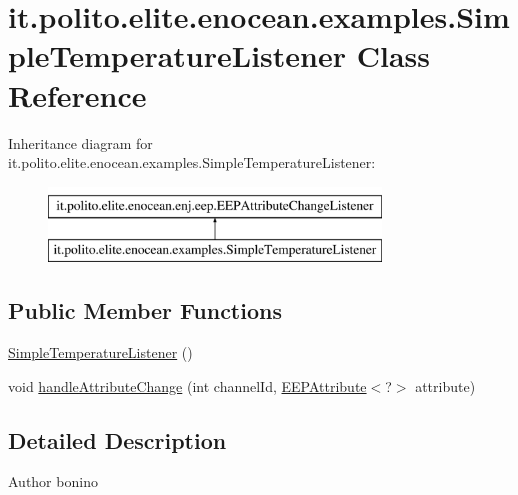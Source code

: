 \hypertarget{classit_1_1polito_1_1elite_1_1enocean_1_1examples_1_1_simple_temperature_listener}{}\section{it.\+polito.\+elite.\+enocean.\+examples.\+Simple\+Temperature\+Listener Class Reference}
\label{classit_1_1polito_1_1elite_1_1enocean_1_1examples_1_1_simple_temperature_listener}
Inheritance diagram for it.\+polito.\+elite.\+enocean.\+examples.\+Simple\+Temperature\+Listener\+:\begin{figure}[H]
\begin{center}
\leavevmode
\includegraphics[height=2.000000cm]{classit_1_1polito_1_1elite_1_1enocean_1_1examples_1_1_simple_temperature_listener}
\end{center}
\end{figure}
\subsection*{Public Member Functions}
\begin{DoxyCompactItemize}
\item 
\hyperlink{classit_1_1polito_1_1elite_1_1enocean_1_1examples_1_1_simple_temperature_listener_a40d02ea70ee69d94e49b4512ee678f8b}{Simple\+Temperature\+Listener} ()
\item 
void \hyperlink{classit_1_1polito_1_1elite_1_1enocean_1_1examples_1_1_simple_temperature_listener_a48101f4ebbdfd8949b0bee0261737ffe}{handle\+Attribute\+Change} (int channel\+Id, \hyperlink{classit_1_1polito_1_1elite_1_1enocean_1_1enj_1_1eep_1_1_e_e_p_attribute}{E\+E\+P\+Attribute}$<$?$>$ attribute)
\end{DoxyCompactItemize}


\subsection{Detailed Description}
\begin{DoxyAuthor}{Author}
bonino 
\end{DoxyAuthor}


